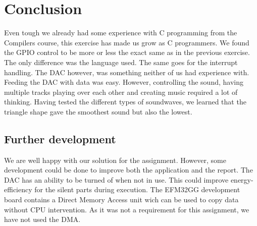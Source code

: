\section{Conclusion}
Even tough we already had some experience with C programming from the Compilers course, this exercise has made us
grow as C programmers. We found the GPIO control to be more or less the exact same as in the previous exercise. The only difference was the language used. The same goes for the interrupt handling. The DAC however, was something neither of us had experience with. Feeding the DAC with data was easy. However, controlling the sound, having multiple tracks playing over each other and creating music required a lot of thinking. Having tested the different types of soundwaves, we learned that the triangle shape gave the smoothest sound but also the lowest. 
\subsection{Further development}
We are well happy with our solution for the assignment. However, some development could be done to improve both the application and the report. The DAC has an ability to be turned of when not in use. This could improve energy-efficiency for the silent parts during execution. The EFM32GG development board contains a Direct Memory Access unit wich can be used to copy data without CPU intervention. As it was not a requirement for this assignment, we have not used the DMA.
